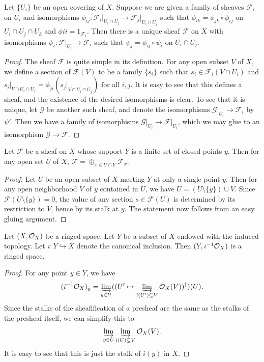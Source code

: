 \begin{exer}
	Let $\{U_i\}$ be an open covering of $X$. Suppose we are given a family
	of sheaves $\mathcal F_i$ on $U_i$ and isomorphisms $\phi_{ij}:
	{\mathcal F_i|}_{U_i \cap U_j} \to {\mathcal F_j|}_{U_i \cap U_j}$ such
	that $\phi_{ik} = \phi_{jk} \circ \phi_{ij}$ on $U_i \cap U_j \cap U_k$ 
	and $\phi{ii} = 1_{\mathcal F_i}$. Then there is a unique sheaf
	$\mathcal F$ on $X$ with isomorphisms $\psi_i: {\mathcal F|}_{U_i} \to
	\mathcal F_i$ such that $\psi_j = \phi_{ij} \circ \psi_i$ on $U_i \cap
	U_j$.
\end{exer}
\begin{proof}
	The sheaf $\mathcal F$ is quite simple in its definition. For any open
	subset $V$ of $X$, we define a section of $\mathcal F(V)$ to be a family
	$\{s_i\}$ such that $s_i \in \mathcal F_i(V \cap U_i)$ and ${s_i|}_{V
	\cap U_i \cap U_j} = \phi_{ji}({s_j|}_{V \cap U_i \cap U_j})$ for all
	$i,j$. It is easy to see that this defines a sheaf, and the existence of
	the desired isomorphisms is clear. To see that it is unique, let
	$\mathcal G$ be another such sheaf, and denote the isomorphisms
	${\mathcal G|}_{U_i} \to \mathcal F_i$ by $\psi'$. Then we have a family
	of isomorphisms ${\mathcal G|}_{U_i} \to {\mathcal F|}_{U_i}$, which
	we may glue to an isomorphism $\mathcal G \to \mathcal F$.
\end{proof}

\begin{exer}
	Let $\mathcal F$ be a sheaf on $X$ whose support $Y$ is a finite set of
	closed points $y$. Then for any open set $U$ of $X$, $\mathcal F =
	\oplus_{x \in U \cap Y} \mathcal F_x$.
\end{exer}
\begin{proof}
	Let $U$ be an open subset of $X$ meeting $Y$ at only a single point $y$.
	Then for any open neighborhood $V$ of $y$ contained in $U$, we have $U
	= (U \setminus \{y\}) \cup V$. Since $\mathcal F(U \setminus \{y\}) =
	0$, the value of any section $s \in \mathcal F(U)$ is determined by its
	restriction to $V$, hence by its stalk at $y$. The statement now follows
	from an easy gluing argument.
\end{proof}

\begin{exer}
	Let $(X,\mathcal{O}_X)$ be a ringed space. Let $Y$ be a subset of $X$ endowed
	with the induced topology. Let $i: Y \hookrightarrow X$ denote the
	canonical inclusion. Then $(Y,i^{-1}\mathcal{O}_X)$ is a ringed space.
\end{exer}
\begin{proof}
	For any point $y \in Y$, we have
	\[
		(i^{-1}\mathcal{O}_X)_y = \varinjlim_{y \in U}
			((U' \mapsto 
				\varinjlim_{i(U')\subseteq V}
					\mathcal{O}_X(V))^\dagger)(U).
	\]
	Since the stalks of the sheafification of a presheaf are the same as the
	stalks of the presheaf itself, we can simplify this to
	\[
		\varinjlim_{y \in U} \varinjlim_{i(U) \subseteq V} \mathcal{O}_X(V).
	\]
	It is easy to see that this is just the stalk of $i(y)$ in $X$.
\end{proof}
